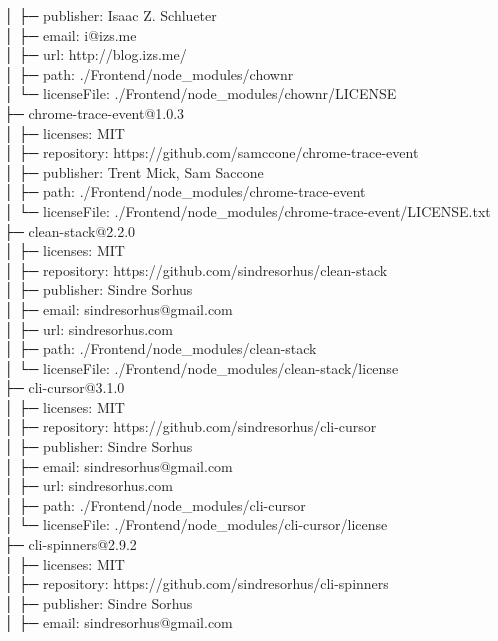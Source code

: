 │  ├─ publisher: Isaac Z. Schlueter\\
│  ├─ email: i@izs.me\\
│  ├─ url: http://blog.izs.me/\\
│  ├─ path: ./Frontend/node\_modules/chownr\\
│  └─ licenseFile: ./Frontend/node\_modules/chownr/LICENSE\\
├─ chrome-trace-event@1.0.3\\
│  ├─ licenses: MIT\\
│  ├─ repository: https://github.com/samccone/chrome-trace-event\\
│  ├─ publisher: Trent Mick, Sam Saccone\\
│  ├─ path: ./Frontend/node\_modules/chrome-trace-event\\
│  └─ licenseFile: ./Frontend/node\_modules/chrome-trace-event/LICENSE.txt\\
├─ clean-stack@2.2.0\\
│  ├─ licenses: MIT\\
│  ├─ repository: https://github.com/sindresorhus/clean-stack\\
│  ├─ publisher: Sindre Sorhus\\
│  ├─ email: sindresorhus@gmail.com\\
│  ├─ url: sindresorhus.com\\
│  ├─ path: ./Frontend/node\_modules/clean-stack\\
│  └─ licenseFile: ./Frontend/node\_modules/clean-stack/license\\
├─ cli-cursor@3.1.0\\
│  ├─ licenses: MIT\\
│  ├─ repository: https://github.com/sindresorhus/cli-cursor\\
│  ├─ publisher: Sindre Sorhus\\
│  ├─ email: sindresorhus@gmail.com\\
│  ├─ url: sindresorhus.com\\
│  ├─ path: ./Frontend/node\_modules/cli-cursor\\
│  └─ licenseFile: ./Frontend/node\_modules/cli-cursor/license\\
├─ cli-spinners@2.9.2\\
│  ├─ licenses: MIT\\
│  ├─ repository: https://github.com/sindresorhus/cli-spinners\\
│  ├─ publisher: Sindre Sorhus\\
│  ├─ email: sindresorhus@gmail.com\\
